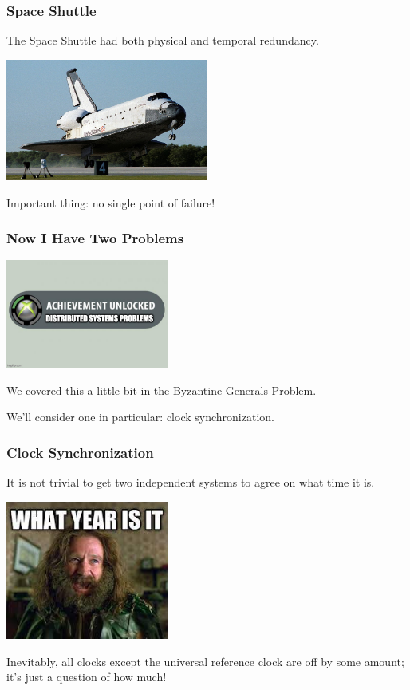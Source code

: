 \begin{frame}
\frametitle{Space Shuttle}

The Space Shuttle had both physical and temporal redundancy.

\begin{center}
	\includegraphics[width=0.5\textwidth]{images/spaceshuttle.jpg}
\end{center}

Important thing: no single point of failure!

\end{frame}

\begin{frame}
\frametitle{Now I Have Two Problems}


\begin{center}
	\includegraphics[width=0.4\textwidth]{images/achievement.jpg}
\end{center}

We covered this a little bit in the Byzantine Generals Problem.

We'll consider one in particular: clock synchronization.

\end{frame}

\begin{frame}
\frametitle{Clock Synchronization}

It is not trivial to get two independent systems to agree on what time it is.

\begin{center}
	\includegraphics[width=0.4\textwidth]{images/jumanji.jpg}
\end{center}

Inevitably, all clocks except the universal reference clock are off by some amount; it's just a question of how much! 

\end{frame}

